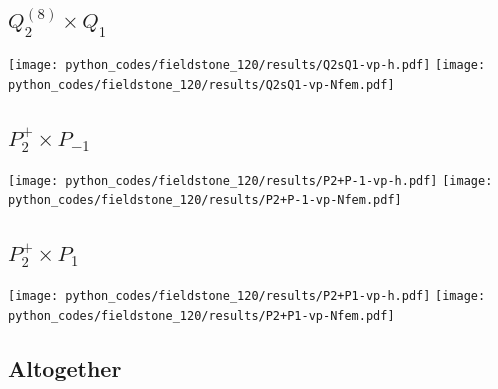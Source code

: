 \subsection*{$Q_2^{(8)}\times Q_1$}
\begin{center}
\texttt{[image: python\_codes/fieldstone\_120/results/Q2sQ1-vp-h.pdf]}
\texttt{[image: python\_codes/fieldstone\_120/results/Q2sQ1-vp-Nfem.pdf]}
\end{center}

\subsection*{$P_2^+\times P_{-1}$}
\begin{center}
\texttt{[image: python\_codes/fieldstone\_120/results/P2+P-1-vp-h.pdf]}
\texttt{[image: python\_codes/fieldstone\_120/results/P2+P-1-vp-Nfem.pdf]}
\end{center}

\subsection*{$P_2^+\times P_{1}$}
\begin{center}
\texttt{[image: python\_codes/fieldstone\_120/results/P2+P1-vp-h.pdf]}
\texttt{[image: python\_codes/fieldstone\_120/results/P2+P1-vp-Nfem.pdf]}
\end{center}





\newpage
\subsection*{Altogether}


